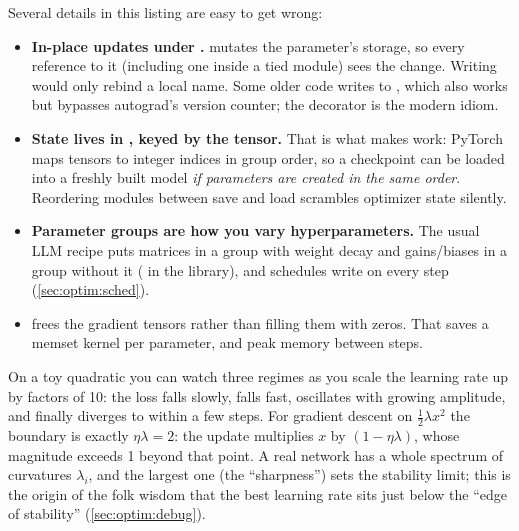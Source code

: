 Several details in this listing are easy to get wrong:
\begin{itemize}
  \item \textbf{In-place updates under .}  mutates the parameter's
        storage, so every reference to it (including one inside a tied module) sees the change.
        Writing  would only rebind a local name. Some older code writes to
        , which also works but bypasses autograd's version counter; the decorator is
        the modern idiom.
  \item \textbf{State lives in , keyed by the tensor.} That is what makes
         work: PyTorch maps tensors to integer indices in group order, so a
        checkpoint can be loaded into a freshly built model \emph{if parameters are created in the
        same order}. Reordering modules between save and load scrambles optimizer state silently.
  \item \textbf{Parameter groups are how you vary hyperparameters.} The usual LLM recipe puts
        matrices in a group with weight decay and gains/biases in a group without it
        ( in the library), and schedules write  on
        every step (\cref{sec:optim:sched}).
  \item \textbf{} frees the gradient tensors rather than
        filling them with zeros. That saves a memset kernel per parameter, and peak memory between steps.
\end{itemize}

\begin{pitfall}
On a toy quadratic you can watch three regimes as you scale the learning rate up by factors of 10:
the loss falls slowly, falls fast, oscillates with growing amplitude, and finally diverges to
 within a few steps. For gradient descent on $\tfrac12\lambda x^2$ the boundary is
exactly $\eta\lambda = 2$: the update multiplies $x$ by $(1-\eta\lambda)$, whose magnitude
exceeds 1 beyond that point. A real network has a whole spectrum of curvatures $\lambda_i$, and
the largest one (the ``sharpness'') sets the stability limit; this is the origin of the folk
wisdom that the best learning rate sits just below the ``edge of stability''
(\cref{sec:optim:debug}).
\end{pitfall}

